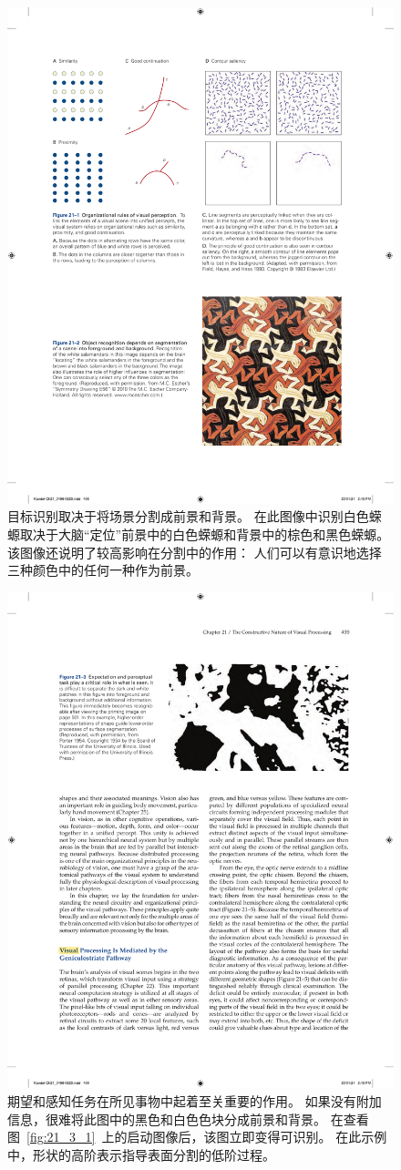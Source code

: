 \begin{figure}[htbp]
	\centering
	\includegraphics[width=0.5\linewidth]{chap21/fig_21_2}
	\caption{目标识别取决于将场景分割成前景和背景。
		在此图像中识别白色蝾螈取决于大脑“定位”前景中的白色蝾螈和背景中的棕色和黑色蝾螈。
		该图像还说明了较高影响在分割中的作用：
		人们可以有意识地选择三种颜色中的任何一种作为前景。}
	\label{fig:21_2}
\end{figure}


\begin{figure}[htbp]
	\centering
	\includegraphics[width=0.7\linewidth]{chap21/fig_21_3}
	\caption{期望和感知任务在所见事物中起着至关重要的作用。
		如果没有附加信息，很难将此图中的黑色和白色色块分成前景和背景。
		在查看图~\ref{fig:21_3_1}~上的启动图像后，该图立即变得可识别。
		在此示例中，形状的高阶表示指导表面分割的低阶过程。}
	\label{fig:21_3}
\end{figure}


